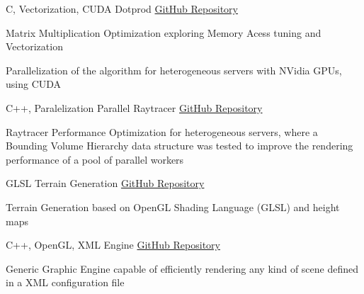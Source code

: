 


\begin{cventries}


\cventry
{C, Vectorization, CUDA} %
  {Dotprod} %
{\href{https://github.com/JoseFilipeFerreira/dotprod}{GitHub Repository}} %
{} %
{ %
\begin{cvitems}
\item {Matrix Multiplication Optimization exploring Memory Acess tuning and Vectorization}
\item {Parallelization of the algorithm for heterogeneous servers with NVidia GPUs, using CUDA}
\end{cvitems}
}


\cventry
{C++, Paralelization} %
  {Parallel Raytracer} %
{\href{https://github.com/JoseFilipeFerreira/parallel-raytracer}{GitHub Repository}} %
{} %
{ %
\begin{cvitems}
\item {Raytracer Performance Optimization for heterogeneous servers, where a Bounding Volume Hierarchy data structure was tested to improve the rendering performance of a pool of parallel workers}
\end{cvitems}
}


\cventry
{GLSL} %
  {Terrain Generation} %
{\href{https://github.com/JoseFilipeFerreira/TerrainGeneration}{GitHub Repository}} %
{} %
{ %
\begin{cvitems}
\item {Terrain Generation based on OpenGL Shading Language (GLSL) and height maps}
\end{cvitems}
}


\cventry
{C++, OpenGL, XML} %
  {Engine} %
{\href{https://github.com/JoseFilipeFerreira/engine}{GitHub Repository}} %
{} %
{ %
\begin{cvitems}
\item {Generic Graphic Engine capable of efficiently rendering any kind of scene
  defined in a XML configuration file}
\end{cvitems}
}


\end{cventries}
